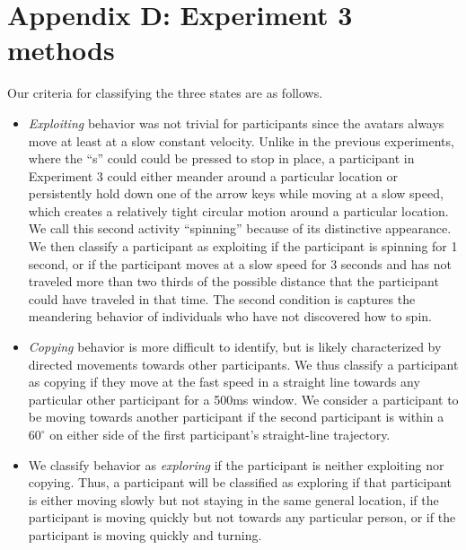 \documentclass[12pt,letterpaper]{article}
\begin{document}
\section*{Appendix D: Experiment 3 methods}

Our criteria for classifying the three states are as follows.
\begin{itemize}
\item \emph{Exploiting} behavior was not trivial for participants since the avatars always move at least at a slow constant velocity. 
Unlike in the previous experiments, where the ``s'' could could be pressed to stop in place, a participant in Experiment 3 could either meander around a particular location or persistently hold down one of the arrow keys while moving at a slow speed, which creates a relatively tight circular motion around a particular location.  
We call this second activity ``spinning'' because of its distinctive appearance.  
We then classify a participant as exploiting if the participant is spinning for 1 second, or if the participant moves at a slow speed for 3 seconds and has not traveled more than two thirds of the possible distance that the participant could have traveled in that time.
The second condition is captures the meandering behavior of individuals who have not discovered how to spin.
\item \emph{Copying} behavior is more difficult to identify, but is likely characterized by directed movements towards other participants. 
We thus classify a participant as copying if they move at the fast speed in a straight line towards any particular other participant for a 500ms window.
We consider a participant to be moving towards another participant if the second participant is within a $60^\circ$ on either side of the first participant's straight-line trajectory.
\item We classify behavior as \emph{exploring} if the participant is neither exploiting nor copying. Thus, a participant will be classified as exploring if that participant is either moving slowly but not staying in the same general location, if the participant is moving quickly but not towards any particular person, or if the participant is moving quickly and turning.
\end{itemize}
\end{document}
